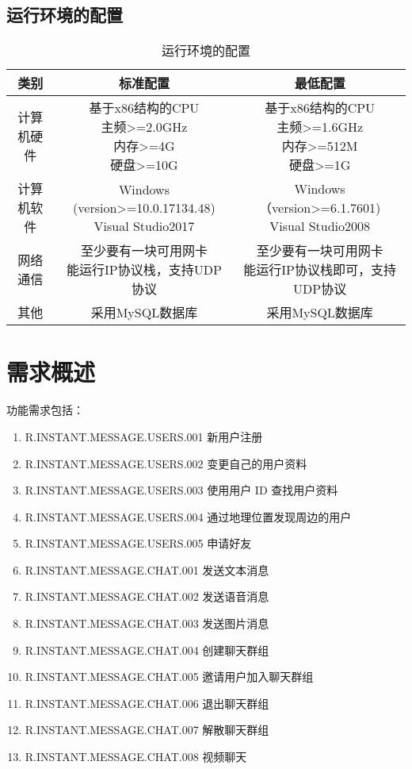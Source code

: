 \subsection{运行环境的配置}
\begin{table}[htbp]
\centering
\caption{运行环境的配置} \label{tab:operation-environment}
\begin{tabular}{|c|c|c|}
    \hline
    类别 & 标准配置 & 最低配置 \\
    \hline
    计算机硬件 & \tabincell{c}{基于x86结构的CPU\\ 主频>=2.0GHz\\ 内存>=4G\\ 硬盘>=10G} & \tabincell{c}{基于x86结构的CPU\\ 主频>=1.6GHz\\ 内存>=512M\\ 硬盘>=1G} \\
    \hline
    计算机软件 & \tabincell{c}{Windows (version>=10.0.17134.48)\\ Visual Studio2017} & \tabincell{c}{Windows（version>=6.1.7601)\\    Visual Studio2008} \\
    \hline
    网络通信 & \tabincell{c}{至少要有一块可用网卡\\ 能运行IP协议栈，支持UDP协议} & \tabincell{c}{至少要有一块可用网卡\\ 能运行IP协议栈即可，支持UDP协议} \\
    \hline
    其他 & 采用MySQL数据库 & 采用MySQL数据库 \\
    \hline

\end{tabular}
\end{table}

\section{需求概述}
功能需求包括：
\begin{enumerate}
\item R.INSTANT.MESSAGE.USERS.001 新用户注册
\item R.INSTANT.MESSAGE.USERS.002 变更自己的用户资料
\item R.INSTANT.MESSAGE.USERS.003 使用用户 ID 查找用户资料
\item R.INSTANT.MESSAGE.USERS.004 通过地理位置发现周边的用户
\item R.INSTANT.MESSAGE.USERS.005 申请好友
\item R.INSTANT.MESSAGE.CHAT.001 发送文本消息
\item R.INSTANT.MESSAGE.CHAT.002 发送语音消息
\item R.INSTANT.MESSAGE.CHAT.003 发送图片消息
\item R.INSTANT.MESSAGE.CHAT.004 创建聊天群组
\item R.INSTANT.MESSAGE.CHAT.005 邀请用户加入聊天群组
\item R.INSTANT.MESSAGE.CHAT.006 退出聊天群组
\item R.INSTANT.MESSAGE.CHAT.007 解散聊天群组
\item R.INSTANT.MESSAGE.CHAT.008 视频聊天
\end{enumerate}


